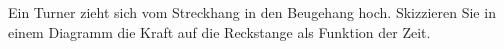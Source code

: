 Ein Turner zieht sich vom Streckhang in den Beugehang hoch. Skizzieren Sie in einem Diagramm die Kraft auf die Reckstange als Funktion der Zeit.
